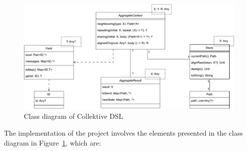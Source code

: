 \begin{figure}[!ht]
    \centering
    \includegraphics[scale=0.73]{document/chapters/4-collektive/images/dsl_class_diagram.pdf}
    \caption{Class diagram of Collektive DSL}
    \label{fig:dsl_class_diagram}
\end{figure}
The implementation of the project involves the elements presented in the class diagram in Figure~\ref{fig:dsl_class_diagram}, which are:
